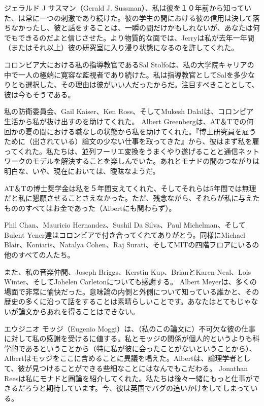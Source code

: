 \documentclass[11pt, oneside]{jsarticle}   	%
\begin{document}
ジェラルド J サスマン（Gerald J. Sussman）、私は彼を１０年前から知っていた、は常に一つの刺激であり続けた。彼の学生の間における彼の信用は決して落ちなかったし、彼と話をすることは、一瞬の間だけかもしれないが、あなたは何でもできるのだよと信じさせた。より物質的な面では、Jerryは私が去年一年間（またはそれ以上）彼の研究室に入り浸り状態になるのを許してくれた。

コロンビア大における私の指導教官であるSal Stolfoは、私の大学院キャリアの中で一人の極端に寛容な監視者であり続けた。私は指導教官としてSalを多少なりとも選択した、その理由は彼がいい人だったからだ。注目すべきこととして、彼は今もそうである。

私の防衛委員会、Gail Kaiser、Ken Ross、そしてMukesh Dalalは、コロンビア生活から私が抜け出すのを助けてくれた。
Albert Greenbergは、AT＆Tでの何回かの夏の間における職なしの状態から私を助けてくれた。『博士研究員を雇うために（出されている）論文の少ない仕事を取ってきた』から、彼はまず私を雇ってくれた。私たちは、並列フーリエ変換をうまくやり遂げることと通信ネットワークのモデルを解決することを楽しんでいた。あれとモナドの間のつながりは明白な、いや、現在においては、曖昧なようだ。

AT＆Tの博士奨学金は私を５年間支えてくれた、そしてそれらは5年間では無理だと私に懇願させることさえなかった。ただ、残念ながら、それらが私に与えたもののすべてはお金であった（Albertにも関わらず）。

Phil Chan、Mauricio Hernandez、Sushil Da Silva、Paul Michelman、そしてBulent Yener達はコロンビアで付き合ってくれてありがとう。同様にMichael Blair、Koniaris、Natalya Cohen、Raj Surati、そしてMITの四階フロアにいるの他のすべての人たち。

また、私の音楽仲間、Joseph Briggs、Kerstin Kup、BrianとKaren Neal、Lois Winter、そしてJohelen Carletonについても感謝する。
Albert Meyerは、多くの場面で非常に愉快だった。意味論の内側と外側について知っている誰かと、その歴史の多くに沿って話をすることは素晴らしいことです。あなたはとてもじゃないが論文からあれを得ることはできない。

エウジニオ モッジ（Eugenio Moggi）は、（私のこの論文に）不可欠な彼の仕事に対して私の感謝を受けるに値する。私とモッジの関係が個人的というよりも科学的であるということから（特に私が彼に会ったことがないということから）、Albertはモッジをここに含めることに異議を唱えた。Albertは、論理学者として、彼が見つけることができる些細なことにはなんでもこだわる。
\newpage
Jonathan Reesは私にモナドと圏論を紹介してくれた。私たちは後々一緒にもっと仕事ができるだろうと期待しています。今、彼は英国でバグの追いかけをしてしまっている。
\end{document}

